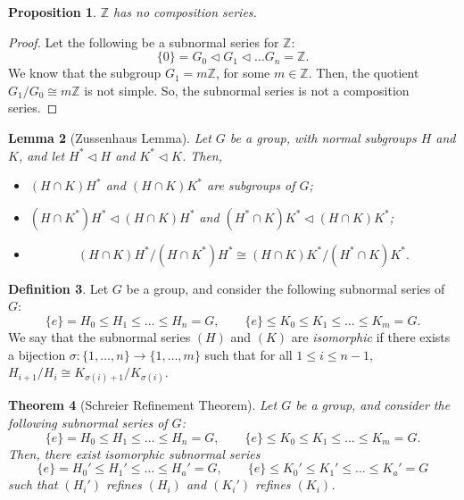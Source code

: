 \documentclass[a4paper, openany]{memoir}
\theoremstyle{definition}
\newtheorem{definition}{Definition}[section]
\theoremstyle{plain}
\newtheorem{theorem}[definition]{Theorem}
\newtheorem{lemma}[definition]{Lemma}
\newtheorem{proposition}[definition]{Proposition}
\begin{document}
    \begin{proposition}
        $\mathbb{Z}$ has no composition series.
    \end{proposition}
    \begin{proof}
        Let the following be a subnormal series for $\mathbb{Z}$:
        \[\{0\} = G_0 \vartriangleleft G_1 \vartriangleleft \dots G_n = \mathbb{Z}.\]
        We know that the subgroup $G_1 = m\mathbb{Z}$, for some $m \in \mathbb{Z}$. Then, the quotient $G_1/G_0 \cong m\mathbb{Z}$ is not simple. So, the subnormal series is not a composition series.
    \end{proof}

    \begin{lemma}[Zussenhaus Lemma]
        Let $G$ be a group, with normal subgroups $H$ and $K$, and let $H^* \vartriangleleft H$ and $K^* \vartriangleleft K$. Then,
        \begin{itemize}
            \item $(H \cap K)H^*$ and $(H \cap K)K^*$ are subgroups of $G$;
            \item $(H \cap K^*)H^* \vartriangleleft (H \cap K)H^*$ and $(H^* \cap K)K^* \vartriangleleft (H \cap K)K^*$;
            \item \[ (H \cap K)H^* / (H \cap K^*)H^* \cong (H \cap K)K^* / (H^* \cap K)K^*.\]
        \end{itemize}
    \end{lemma}
        

    \begin{definition}
        Let $G$ be a group, and consider the following subnormal series of $G$:
        \[\{e\} = H_0 \leq H_1 \leq \dots \leq H_n = G, \qquad \{e\} \leq K_0 \leq K_1 \leq \dots \leq K_m = G.\]
        We say that the subnormal series $(H)$ and $(K)$ are \emph{isomorphic} if there exists a bijection $\sigma: \{1, \dots, n\} \to \{1, \dots, m\}$ such that for all $1 \leq i \leq n-1$, $H_{i+1}/H_i \cong K_{\sigma(i)+1}/K_{\sigma(i)}$.
    \end{definition}

    \begin{theorem}[Schreier Refinement Theorem]
        Let $G$ be a group, and consider the following subnormal series of $G$:
        \[\{e\} = H_0 \leq H_1 \leq \dots \leq H_n = G, \qquad \{e\} \leq K_0 \leq K_1 \leq \dots \leq K_m = G.\]
        Then, there exist isomorphic subnormal series
        \[\{e\} = H_0' \leq H_1' \leq \dots \leq H_a' = G, \qquad \{e\} \leq K_0' \leq K_1' \leq \dots \leq K_a' = G\]
        such that $(H_i')$ refines $(H_i)$ and $(K_i')$ refines $(K_i)$.        
    \end{theorem}
\end{document}
